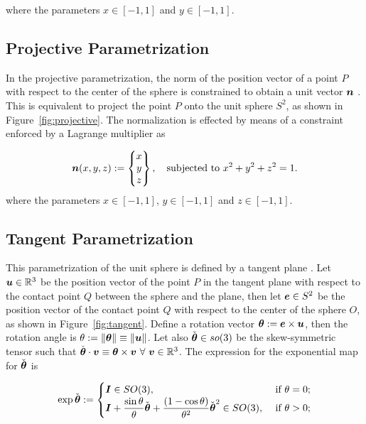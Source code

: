 \documentclass[12pt]{article}
\numberwithin{equation}{section}
\begin{document}
where the parameters $x \in [-1, 1]$ and $y \in [-1, 1]$.

\subsection{Projective Parametrization}
\label{subsec:projective}

In the projective parametrization, the norm of the position vector of
a point $P$ with respect to the center of the sphere is constrained to
obtain a unit vector ${\boldsymbol{n}}$ \citep{Ortiz.etal:1987}. This is
equivalent to project the point $P$ onto the unit sphere $S^2$, as
shown in Figure~\ref{fig:projective}. The normalization is effected
by means of a constraint enforced by a Lagrange multiplier as

\begin{equation}
  {\boldsymbol{n}}(x,y,z)
  := 
  \begin{Bmatrix}
    x
    \\
    y
    \\
    z
  \end{Bmatrix},
  \quad
  \text{subjected to}~x^2+y^2+z^2 = 1.
\end{equation}
where the parameters $x \in [-1, 1]$, $y \in [-1, 1]$ 
and $z \in [-1, 1]$.
\subsection{Tangent Parametrization}
\label{subsec:tangent}

This parametrization of the unit sphere is defined by a tangent plane
\citep{Simo.Fox:1989}. Let ${\boldsymbol{u}}\in \mathbb{R}^3$ be the position vector
of the point $P$ in the tangent plane with respect to the contact
point $Q$ between the sphere and the plane, then let ${\boldsymbol{e}} \in S^2$ be
the position vector of the contact point $Q$ with respect to the
center of the sphere $O$, as shown in Figure~\ref{fig:tangent}. Define
a rotation vector ${\boldsymbol{\theta}} := {\boldsymbol{e}} \times {\boldsymbol{u}}$, then the rotation angle
is $\theta := \| {\boldsymbol{\theta}} \| \equiv \| {\boldsymbol{u}} \|$. Let also
$\check{{\boldsymbol{\theta}}} \in so(3)$ be the skew-symmetric tensor such that
$\check{{\boldsymbol{\theta}}} \cdot {\boldsymbol{v}} \equiv {\boldsymbol{\theta}} \times {\boldsymbol{v}} \ \forall \ {\boldsymbol{v}}
\in \mathbb{R}^3$. The expression for the exponential map for
$\check{{\boldsymbol{\theta}}}$ is

\begin{equation}
  \exp \check{{\boldsymbol{\theta}}}
  :=
  \begin{cases}
    {\boldsymbol{I}} \in SO(3),
    &
    \text{ if }\theta = 0;
    \\
    \displaystyle{
      {\boldsymbol{I}}+ \frac{\sin \theta}{\theta} \check{{\boldsymbol{\theta}}} +
      \frac{(1 - \cos \theta)}{\theta^2} \check{{\boldsymbol{\theta}}}^2 \in SO(3),
    }
    &
    \text{ if }\theta > 0;
  \end{cases}
  \label{eq:Rodrigues-formula}
\end{equation}
\end{document}
